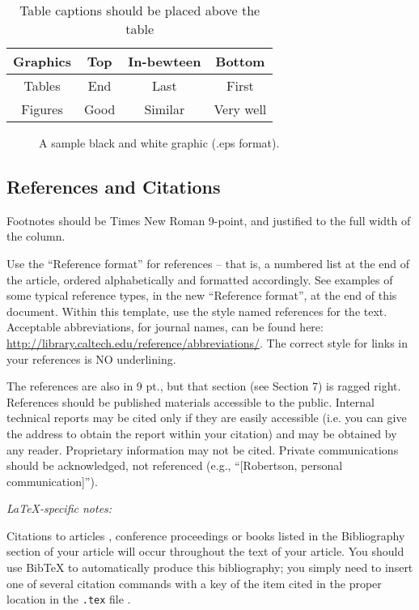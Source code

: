 \documentclass{ipres_proc_article-sp}
\begin{document}
\begin{table}
\centering
\caption{Table captions should be placed above the table}
\begin{tabular}{|c|c|c|c|} \hline
Graphics & Top & In-bewteen & Bottom \\ \hline
Tables & End & Last & First \\ \hline
Figures & Good & Similar & Very well \\ \hline
\end{tabular}
\end{table}

\begin{figure}
\centering
{}
\caption{A sample black and white graphic (.eps format).}
\end{figure}

\subsection{References and Citations}
Footnotes should be Times New Roman 9-point, and justified to the full
width of the column.

Use the ``Reference format'' for references -- that is, a numbered list
at the end of the article, ordered alphabetically and formatted
accordingly. See examples of some typical reference types, in the
new ``Reference format'', at the end of this document. Within this
template, use the style named references for the text. Acceptable
abbreviations, for journal names, can be found here:
\url{http://library.caltech.edu/reference/abbreviations/}. The correct style
for links in your references is NO underlining.

The references are also in 9 pt., but that section (see Section 7)
is ragged right. References should be published materials accessible
to the public. Internal technical reports may be cited only if they
are easily accessible (i.e. you can give the address to obtain the
report within your citation) and may be obtained by any reader.
Proprietary information may not be cited. Private communications should
be acknowledged, not referenced  (e.g., ``[Robertson, personal communication]'').

\textit{\LaTeX-specific notes:}

Citations to articles \cite{bowman:reasoning,
clark:pct, braams:babel, herlihy:methodology},
conference proceedings \cite{clark:pct} or
books \cite{salas:calculus, Lamport:LaTeX} listed
in the Bibliography section of your
article will occur throughout the text of your article.
You should use BibTeX to automatically produce this bibliography;
you simply need to insert one of several citation commands with
a key of the item cited in the proper location in
the \texttt{.tex} file \cite{Lamport:LaTeX}.
\end{document}
